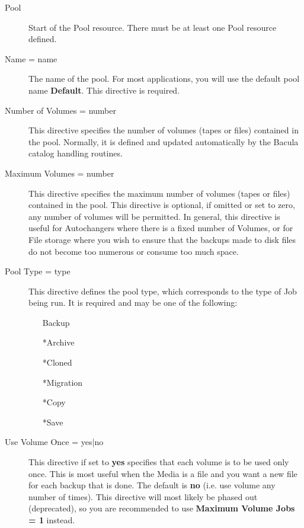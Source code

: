 \begin{description}

\item [Pool]
   Start of the Pool resource. There must  be at least one Pool resource defined.


\item [Name = \lt{}name\gt{}]
   The name of the pool.  For most applications, you will use the default pool 
name {\bf Default}. This directive is required.  

\item [Number of Volumes = \lt{}number\gt{}]
   This directive specifies  the number of volumes (tapes or files) contained in
the pool.  Normally, it is defined and updated automatically by the  Bacula
catalog handling routines. 
\label{MaxVolumes}

\item [Maximum Volumes = \lt{}number\gt{}]
   This directive specifies the  maximum number of volumes (tapes or files)
contained in the pool.  This directive is optional, if omitted or set to zero,
any number  of volumes will be permitted. In general, this directive is useful
for Autochangers where there is a fixed number of Volumes, or  for File
storage where you wish to ensure that the backups made to  disk files do not
become too numerous or consume too much space.  

\item [Pool Type = \lt{}type\gt{}]
   This directive defines the pool  type, which corresponds to the type of Job
being run. It is  required and may be one of the following:  

\begin{itemize}
\item [Backup]  
\item [*Archive]  
\item [*Cloned]  
\item [*Migration]  
\item [*Copy]  
\item [*Save]  
   \end{itemize}

\item [Use Volume Once = \lt{}yes|no\gt{}]
   This directive  if set to {\bf yes} specifies that each volume is to be  used
only once. This is most useful when the Media is a  file and you want a new
file for each backup that is  done. The default is {\bf no} (i.e. use volume
any  number of times). This directive will most likely be phased out 
(deprecated), so you are recommended to use {\bf Maximum Volume Jobs = 1} 
instead.  


\end{description}
